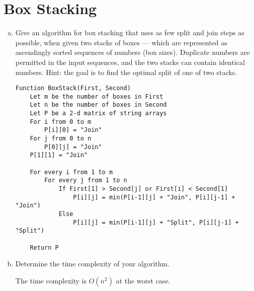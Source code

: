\documentclass[12pt]{article}
\begin{document}
\section{Box Stacking}\label{box stacking}
\begin{enumerate}[(a)]
\item Give an algorithm for box stacking that uses as few split and join steps as possible, when given two stacks of boxes — which are represented as ascendingly sorted sequences of numbers (box sizes). Duplicate numbers are permitted in the input sequences, and the two stacks can contain identical numbers. Hint: the goal is to find the optimal split of one of two stacks.
\begin{addmargin}[2em]{2em}
\begin{lstlisting}
Function BoxStack(First, Second)
	Let m be the number of boxes in First
	Let n be the number of boxes in Second
	Let P be a 2-d matrix of string arrays
	For i from 0 to m
		P[i][0] = "Join"
	For j from 0 to n
		P[0][j] = "Join"
	P[1][1] = "Join"

	For every i from 1 to m
		For every j from 1 to n
			If First[1] > Second[j] or First[i] < Second[1]
				P[i][j] = min(P[i-1][j] + "Join", P[i][j-1] + "Join")
			Else 
				P[i][j] = min(P[i-1][j] + "Split", P[i][j-1] + "Split")

	Return P
\end{lstlisting}
\end{addmargin}
\item Determine the time complexity of your algorithm.
\begin{addmargin}[4em]{2em}
The time complexity is $O(n^2)$ at the worst case.
\end{addmargin}
\end{enumerate}
\end{document}
